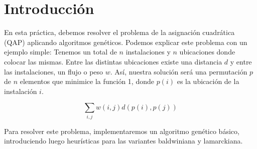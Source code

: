 \section{Introducción}
En esta práctica, debemos resolver el problema de la asignación cuadrática (QAP) aplicando algoritmos genéticos. Podemos explicar este problema con un ejemplo simple: Tenemos un total de $n$ instalaciones y $n$ ubicaciones donde colocar las mismas. Entre las distintas ubicaciones existe una distancia $d$ y entre las instalaciones, un flujo o peso $w$. Así, nuestra solución será una permutación $p$ de $n$ elementos que minimice la función 1, donde $p(i)$ es la ubicación de la instalación $i$.

\begin{equation}
    \sum_{i,j} w(i,j) d(p(i),p(j))
\end{equation}

Para resolver este problema, implementaremos un algoritmo genético básico, introduciendo luego heurísticas para las variantes baldwiniana y lamarckiana.